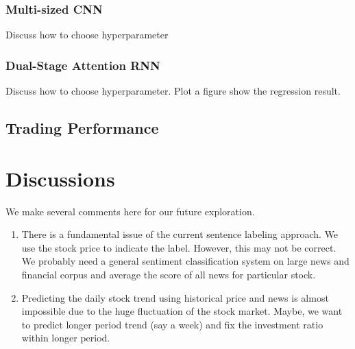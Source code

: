 \documentclass[11pt,a4paper]{article}
\begin{document}
\subsubsection{Multi-sized CNN}
Discuss how to choose hyperparameter

\subsubsection{Dual-Stage Attention RNN}
Discuss how to choose hyperparameter. Plot a figure show the regression result.

\subsection{Trading Performance}


\section{Discussions}
We make several comments here for our future exploration.
\begin{enumerate}
  \item There is a fundamental issue of the current sentence labeling approach. We use the stock price to indicate the label. However, this may not be correct. We probably need a general sentiment classification system on large news and financial corpus and average the score of all news for particular stock.
  \item Predicting the daily stock trend using historical price and news is almost impossible due to the huge fluctuation of the stock market. Maybe, we want to predict longer period trend (say a week) and fix the investment ratio within longer period.
\end{enumerate}





%
\end{document}
